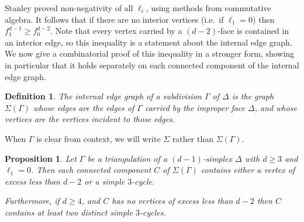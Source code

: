 \documentclass[10pt]{amsart}
\newtheorem{prop}[theorem]{Proposition}
\newtheorem{defi}[theorem]{Definition}
\newcommand{\ie}{i.e.\ }
\begin{document}
Stanley proved non-negativity of all $\ell_i$, using methods from commutative algebra. 
It follows that if there are no interior vertices (\ie if $\ell_1 = 0$) then 
$f_1^{d-1} \geq f_0^{d-2}$. Note that every vertex carried by a $(d-2)$-face is contained 
in an interior edge, so this inequality is a statement about the internal edge graph. 
We now give a combinatorial proof of this inequality in a stronger form, showing in particular
that it holds separately on each connected component of the internal edge graph.


\begin{defi}
The \emph{internal edge graph} of a subdivision $\Gamma$ of $\Delta$ is the graph
$\Sigma(\Gamma)$ whose edges are the edges of $\Gamma$ carried by the improper face $\Delta$,
and whose vertices are the vertices incident to those edges. 
\end{defi}

\noindent When $\Gamma$ is clear from context, we will write $\Sigma$ rather than $\Sigma(\Gamma)$. 

\begin{prop}\label{prop:each component has a low excess or low chi}
Let $\Gamma$ be a triangulation of a $(d - 1)$-simplex $\Delta$ with $d \geq 3$ and 
$\ell_1 = 0$.
Then each connected component $C$ of $\Sigma(\Gamma)$ contains either a vertex of excess
less than $d-2$ or a simple $3$-cycle. 

Furthermore, if $d \geq 4$, and $C$ has no vertices of excess less than $d-2$ then 
$C$ contains at least two distinct simple $3$-cycles. 
\end{prop}
\end{document}
